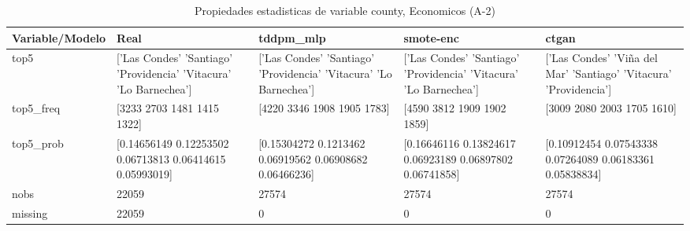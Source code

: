 \begin{table}[H]
\centering
\fontsize{8}{14}\selectfont
\caption{Propiedades  estadisticas de variable county, Economicos (A-2)}
\label{table-stats-economicos-a-2-county}
\begin{tabular}{|l|m{10em}|m{10em}|m{10em}|m{10em}|}
\hline
 \rowcolor[gray]{0.8}
Variable/Modelo & Real & tddpm\_mlp & smote-enc & ctgan \\
\hline top5 & ['Las Condes' 'Santiago' 'Providencia' 'Vitacura' 'Lo Barnechea'] & ['Las Condes' 'Santiago' 'Providencia' 'Vitacura' 'Lo Barnechea'] & ['Las Condes' 'Santiago' 'Providencia' 'Vitacura' 'Lo Barnechea'] & ['Las Condes' 'Viña del Mar' 'Santiago' 'Vitacura' 'Providencia'] \\
\hline top5\_freq & [3233 2703 1481 1415 1322] & [4220 3346 1908 1905 1783] & [4590 3812 1909 1902 1859] & [3009 2080 2003 1705 1610] \\
\hline top5\_prob & [0.14656149 0.12253502 0.06713813 0.06414615 0.05993019] & [0.15304272 0.1213462  0.06919562 0.06908682 0.06466236] & [0.16646116 0.13824617 0.06923189 0.06897802 0.06741858] & [0.10912454 0.07543338 0.07264089 0.06183361 0.05838834] \\
\hline nobs & 22059 & 27574 & 27574 & 27574 \\
\hline missing & 22059 & 0 & 0 & 0 \\
\hline
\end{tabular}
\end{table}
